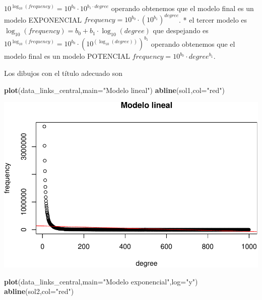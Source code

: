 \documentclass[
]{article}
\newenvironment{Shaded}{\begin{snugshade}}{\end{snugshade}}
\newcommand{\DataTypeTok}[1]{\textcolor[rgb]{0.13,0.29,0.53}{#1}}
\newcommand{\KeywordTok}[1]{\textcolor[rgb]{0.13,0.29,0.53}{\textbf{#1}}}
\newcommand{\NormalTok}[1]{#1}
\newcommand{\StringTok}[1]{\textcolor[rgb]{0.31,0.60,0.02}{#1}}
\begin{document}
\(10^{\log_{10}(frequency)}=10^{b_0}\cdot 10^{b_1\cdot degree}\)
operando obtenemos que el modelo final es un modelo EXPONENCIAL
\(frequency=10^{b_0}\cdot \left(10^{b_1}\right)^{degree}\). * el tercer
modelo es \(\log_{10}(frequency) = b_0+b_1\cdot \log_{10}(degree)\) que
despejando es
\(10^{\log_{10}(frequency)}=10^{b_0}\cdot \left(10^{\left(\log_{10}(degree)\right)}\right)^{b_1}\)
operando obtenemos que el modelo final es un modelo POTENCIAL
\(frequency=10^{b_0}\cdot degree^{b_1}.\)

Los dibujos con el título adecuado son

\begin{Shaded}
\begin{Highlighting}[]
\KeywordTok{plot}\NormalTok{(data\_links\_central,}\DataTypeTok{main=}\StringTok{"Modelo lineal"}\NormalTok{)}
\KeywordTok{abline}\NormalTok{(sol1,}\DataTypeTok{col=}\StringTok{"red"}\NormalTok{)}
\end{Highlighting}
\end{Shaded}

\includegraphics{taller_problemas_resueltos_extra_1_files/figure-latex/unnamed-chunk-55-1.pdf}

\begin{Shaded}
\begin{Highlighting}[]
\KeywordTok{plot}\NormalTok{(data\_links\_central,}\DataTypeTok{main=}\StringTok{"Modelo exponencial"}\NormalTok{,}\DataTypeTok{log=}\StringTok{"y"}\NormalTok{)}
\KeywordTok{abline}\NormalTok{(sol2,}\DataTypeTok{col=}\StringTok{"red"}\NormalTok{)}
\end{Highlighting}
\end{Shaded}
\end{document}
